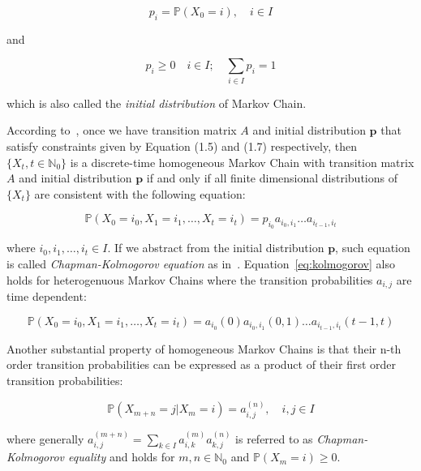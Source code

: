 \begin{equation}
p_i = \mathbb{P}(X_0=i), \quad i \in I
\end{equation}

and 

\begin{equation}
p_i \geq 0 \quad i \in I; \quad \sum\limits_{i \in I} p_i = 1
\end{equation}

\noindent which is also called the \textit{initial distribution} of Markov Chain.

According to~\citep{Praskova2012}, once we have transition matrix $A$ and initial distribution $\textbf{p}$ that satisfy constraints given by Equation (1.5) and (1.7) respectively,
then $\{X_t,t \in \mathbb{N}_0\}$ is a discrete-time homogeneous Markov Chain with transition matrix $A$ and initial distribution $\textbf{p}$ 
if and only if all finite dimensional distributions of $\{X_t\}$ are consistent with the following equation:

\begin{equation} \label{eq:kolmogorov}
    \mathbb{P}(X_{0}=i_0,X_{1}=i_1,\ldots,X_{t}=i_t) = p_{i_0} a_{i_0,i_1} \ldots a_{i_{t-1},i_t}
\end{equation}

where $i_0,i_1,\ldots,i_t \in I$. If we abstract from the initial distribution $\textbf{p}$, such equation is called \textit{Chapman-Kolmogorov equation} as in~\citep{Yin2004}.
Equation~\ref{eq:kolmogorov} also holds for heterogenuous Markov Chains where the transition probabilities $a_{i,j}$ are time dependent:

\begin{equation}
    \mathbb{P}(X_{0}=i_0,X_{1}=i_1,\ldots,X_{t}=i_t) = a_{i_0}(0) a_{i_0,i_1}(0,1) \ldots a_{i_{t-1},i_t}(t-1,t)
\end{equation}

Another substantial property of homogeneous Markov Chains is that their n-th order transition probabilities can be expressed as a product of their first order transition probabilities:

\begin{equation}
    \mathbb{P}(X_{m+n} = j|X_{m} = i) = a_{i,j}^{(n)}, \quad i,j \in I
\end{equation}

where generally $a_{i,j}^{(m+n)} = \sum\limits_{k \in I} a_{i,k}^{(m)} a_{k,j}^{(n)}$ is referred to as \textit{Chapman-Kolmogorov equality} and holds for $m,n \in \mathbb{N}_0$ and $\mathbb{P}(X_m=i) \geq 0$.~\citep{Praskova2012}

